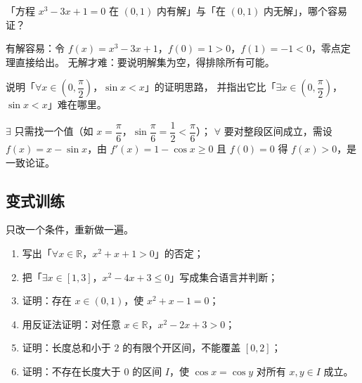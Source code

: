 \begin{explore}
\begin{example}
「方程 $x^3-3x+1=0$ 在 $(0,1)$ 内有解」与「在 $(0,1)$ 内无解」，哪个容易证？
\end{example}
\begin{solution}
有解容易：令 $f(x)=x^3-3x+1$，$f(0)=1>0$，$f(1)=-1<0$，零点定理直接给出。
无解才难：要说明解集为空，得排除所有可能。
\end{solution}

\begin{problem}
说明「$\forall x\in\left(0,\dfrac{\pi}{2}\right)$，$\sin x<x$」的证明思路，
并指出它比「$\exists x\in\left(0,\dfrac{\pi}{2}\right)$，$\sin x<x$」难在哪里。
\end{problem}
\begin{solution}
$\exists$ 只需找一个值（如 $x=\dfrac{\pi}{6}$，$\sin\dfrac{\pi}{6}=\dfrac12<\dfrac{\pi}{6}$）；
$\forall$ 要对整段区间成立，需设 $f(x)=x-\sin x$，由 $f'(x)=1-\cos x\geq0$ 且 $f(0)=0$
得 $f(x)>0$，是一致论证。
\end{solution}
\end{explore}

\begin{inclasstest}
\subsection{变式训练}
只改一个条件，重新做一遍。
\begin{enumerate}
  \item 写出「$\forall x\in\mathbb{R}$，$x^2+x+1>0$」的否定；
  \item 把「$\exists x\in[1,3]$，$x^2-4x+3\leq0$」写成集合语言并判断；
  \item 证明：存在 $x\in(0,1)$，使 $x^2+x-1=0$；
  \item 用反证法证明：对任意 $x\in\mathbb{R}$，$x^2-2x+3>0$；
  \item 证明：长度总和小于 $2$ 的有限个开区间，不能覆盖 $[0,2]$；
  \item 证明：不存在长度大于 $0$ 的区间 $I$，使 $\cos x=\cos y$ 对所有 $x,y\in I$ 成立。
\end{enumerate}
\end{inclasstest}


